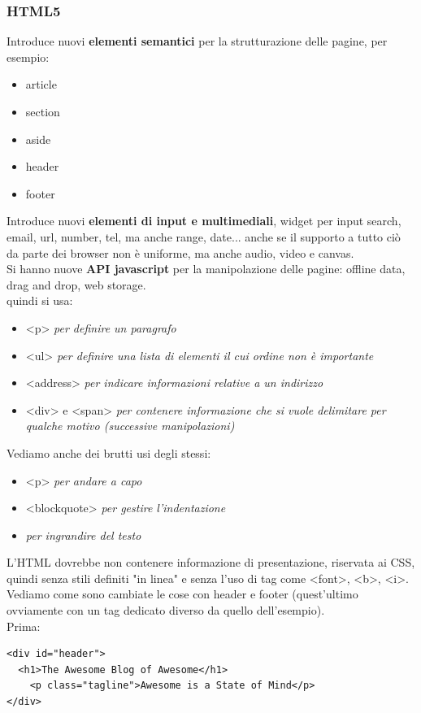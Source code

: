 \documentclass[a4paper,12pt, oneside]{book}
\begin{document}
\subsubsection{HTML5}
Introduce nuovi \textbf{elementi semantici} per la strutturazione delle pagine, per esempio:
\begin{itemize}
	\item article
	\item section
	\item aside
	\item header
	\item footer
\end{itemize}
Introduce nuovi \textbf{elementi di input e multimediali}, widget per input search, email, url, number, tel, ma anche range, date... anche se il supporto a tutto ciò da parte dei browser non è uniforme, ma anche audio, video e canvas.\\
Si hanno nuove \textbf{API javascript} per la manipolazione delle pagine: offline data, drag and drop, web storage.\\
quindi si usa:
\begin{itemize}
	\item <p> \textit{per definire un paragrafo}
	\item <ul> \textit{per definire una lista di elementi il cui ordine non è importante}
	\item <address> \textit{per indicare informazioni relative a un indirizzo}
	\item <div> e <span> \textit{per contenere informazione che si vuole delimitare per qualche motivo (successive manipolazioni)}
\end{itemize}
Vediamo anche dei brutti usi degli stessi:
\begin{itemize}
	\item <p> \textit{per andare a capo}
	\item <blockquote> \textit{per gestire l'indentazione}
	\item <h1> \textit{per ingrandire del testo}
\end{itemize}
L’HTML dovrebbe non contenere informazione di presentazione, riservata ai CSS, quindi senza stili definiti "in linea" e senza l'uso di tag come <font>, <b>, <i>. \\
Vediamo come sono cambiate le cose con header e footer (quest'ultimo ovviamente con un tag dedicato diverso da quello dell'esempio). \\
Prima:
\begin{verbatim}
<div id="header">
  <h1>The Awesome Blog of Awesome</h1>
    <p class="tagline">Awesome is a State of Mind</p>
</div>
\end{verbatim}
\end{document}
